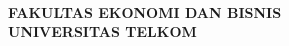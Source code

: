 \begin{center}
\vspace{1.2cm}

{\bfseries
\MakeUppercase{\NamaProdi}\\[2pt]
FAKULTAS EKONOMI DAN BISNIS\\[2pt]
UNIVERSITAS TELKOM\\[2pt]
\MakeUppercase{\KotaTempat}\\[2pt]
\TahunLulus
}

\end{center}
